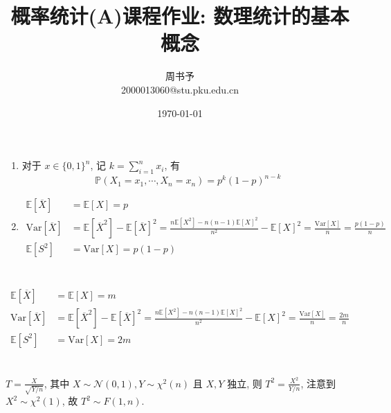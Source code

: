 \documentclass[8pt]{article}
\title{\heiti\zihao{2} 概率统计(A)课程作业: 数理统计的基本概念}
\author{\kaishu\zihao{-3} 周书予\\2000013060@stu.pku.edu.cn}
\date{\today}
\theoremstyle{compact}
\def\P#1{\mathbb{P}\left({#1}\right)}
\def\E#1{\mathbb{E}\left[{#1}\right]}
\def\Var#1{\text{Var}\left[{#1}\right]}
\begin{document}
\pagestyle{plain}

\maketitle

\section{}
\begin{enumerate}
	\item 对于 $x \in \{0, 1\}^n$, 记 $k = \sum\limits_{i=1}^{n}x_i$, 有$$\P{X_1 = x_1, \cdots, X_n = x_n} = p^k(1 - p)^{n - k}$$
	\item \begin{equation*}
		\begin{split}
			\E{\overline{X}} &= \E{X} = p \\
			\Var{\overline{X}} &= \E{\overline{X}^2} - \E{\overline{X}}^2 = \frac{n \E{X^2} - n(n-1)\E{X}^2}{n^2} - \E{X}^2 = \frac{\Var{X}}{n} = \frac{p(1 - p)}{n}\\
			\E{S^2} &= \Var{X} = p(1 - p)
		\end{split}
	\end{equation*}
\end{enumerate}

\section{}
\begin{equation*}
	\begin{split}
		\E{\overline{X}} &= \E{X} = m \\
		\Var{\overline{X}} &= \E{\overline{X}^2} - \E{\overline{X}}^2 = \frac{n \E{X^2} - n(n-1)\E{X}^2}{n^2} - \E{X}^2 = \frac{\Var{X}}{n} = \frac{2m}{n}\\
		\E{S^2} &= \Var{X} = 2m
	\end{split}
\end{equation*}

\section{}
$T = \frac{X}{\sqrt{Y / n}}$, 其中 $X \sim \mathcal N(0, 1), Y \sim \chi^2(n)$ 且 $X, Y$ 独立, 则 $T^2 = \frac{X^2}{Y / n}$, 注意到 $X^2 \sim \chi^2(1)$, 故 $T^2 \sim F(1, n)$.
\end{document}
